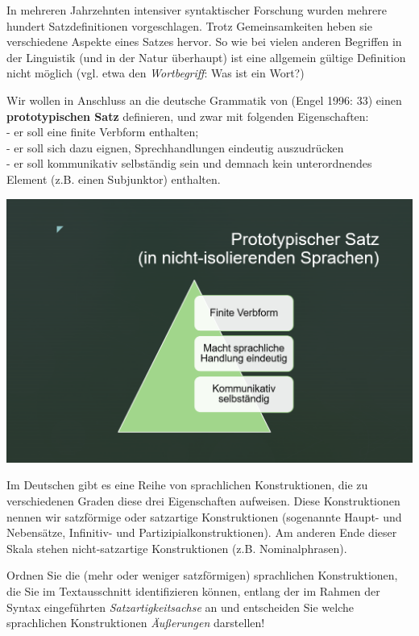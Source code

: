 \documentclass[
  letterpaper,
  DIV=11,
  numbers=noendperiod]{scrreprt}
\begin{document}
In mehreren Jahrzehnten intensiver syntaktischer Forschung wurden
mehrere hundert Satzdefinitionen vorgeschlagen. Trotz Gemeinsamkeiten
heben sie verschiedene Aspekte eines Satzes hervor. So wie bei vielen
anderen Begriffen in der Linguistik (und in der Natur überhaupt) ist
eine allgemein gültige Definition nicht möglich (vgl. etwa den
\emph{Wortbegriff}: Was ist ein Wort?)

Wir wollen in Anschluss an die deutsche Grammatik von (Engel 1996: 33)
einen \textbf{prototypischen Satz} definieren, und zwar mit folgenden
Eigenschaften:\\
- er soll eine finite Verbform enthalten;\\
- er soll sich dazu eignen, Sprechhandlungen eindeutig auszudrücken\\
- er soll kommunikativ selbständig sein und demnach kein unterordnendes
Element (z.B. einen Subjunktor) enthalten.

\includegraphics[width=1\textwidth,height=\textheight]{./pictures/satzdefinition.png}

Im Deutschen gibt es eine Reihe von sprachlichen Konstruktionen, die zu
verschiedenen Graden diese drei Eigenschaften aufweisen. Diese
Konstruktionen nennen wir satzförmige oder satzartige Konstruktionen
(sogenannte Haupt- und Nebensätze, Infinitiv- und
Partizipialkonstruktionen). Am anderen Ende dieser Skala stehen
nicht-satzartige Konstruktionen (z.B. Nominalphrasen).

Ordnen Sie die (mehr oder weniger satzförmigen) sprachlichen
Konstruktionen, die Sie im Textausschnitt identifizieren können, entlang
der im Rahmen der Syntax eingeführten \emph{Satzartigkeitsachse} an und
entscheiden Sie welche sprachlichen Konstruktionen \emph{Äußerungen}
darstellen!
\end{document}
